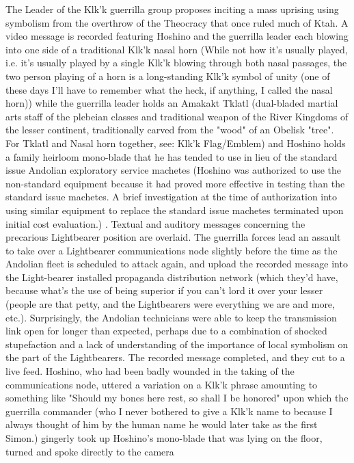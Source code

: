 \begin{itemize}
The Leader of the Klk'k guerrilla group proposes inciting a mass
uprising using symbolism from the overthrow of the Theocracy that once
ruled much of Ktah. A video message is recorded featuring Hoshino and
the guerrilla leader each blowing into one side of a traditional Klk'k
nasal horn (While not how it's usually played, i.e. it's usually
played by a single Klk'k blowing through both nasal passages, the two
person playing of a horn is a long-standing Klk'k symbol of unity
(one of these days I'll have to remember what the heck, if anything,
I called the nasal horn)) while the guerrilla leader holds an Amakakt
Tklatl (dual-bladed martial arts staff of the plebeian classes and
traditional weapon of the River Kingdoms of the lesser continent,
traditionally carved from the "wood" of an Obelisk "tree". For
Tklatl and Nasal horn together, see: Klk'k Flag/Emblem) and Hoshino
holds a family heirloom mono-blade that he has tended to use in lieu
of the standard issue Andolian exploratory service machetes (Hoshino
was authorized to use the non-standard equipment because it had proved
more effective in testing than the standard issue machetes. A brief
investigation at the time of authorization into using similar
equipment to replace the standard issue machetes terminated upon
initial cost evaluation.) . Textual and auditory messages concerning
the precarious Lightbearer position are overlaid. The guerrilla forces
lead an assault to take over a Lightbearer communications node
slightly before the time as the Andolian fleet is scheduled to attack
again, and upload the recorded message into the Light-bearer installed
propaganda distribution network (which they'd have, because what's
the use of being superior if you can't lord it over your lesser
(people are that petty, and the Lightbearers were everything we are
and more, etc.). Surprisingly, the Andolian technicians were able to
keep the transmission link open for longer than expected, perhaps due
to a combination of shocked stupefaction and a lack of
understanding of the importance of local symbolism on the part of the
Lightbearers. The recorded message completed, and they cut to a live
feed. Hoshino, who had been badly wounded in the taking of the
communications node, uttered a variation on a Klk'k phrase amounting
to something like "Should my bones here rest, so shall I be honored" 
upon which the guerrilla commander (who I never bothered to give a Klk'k name to because I always thought of him by the human name he would
later take as the first Simon.) gingerly took up Hoshino's mono-blade
that was lying on the floor, turned and spoke directly to the camera

\end{itemize}

